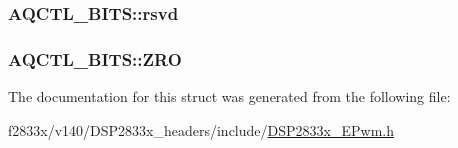 \subsubsection[{rsvd}]{ A\+Q\+C\+T\+L\+\_\+\+B\+I\+T\+S\+::rsvd}\label{struct_a_q_c_t_l___b_i_t_s_a8ac84438d588671b2e7d9f6a48eb4092}
\hypertarget{struct_a_q_c_t_l___b_i_t_s_a364e3885e2683e062df9092186017c2f}{}
\subsubsection[{Z\+R\+O}]{ A\+Q\+C\+T\+L\+\_\+\+B\+I\+T\+S\+::\+Z\+R\+O}\label{struct_a_q_c_t_l___b_i_t_s_a364e3885e2683e062df9092186017c2f}


The documentation for this struct was generated from the following file\+:\begin{DoxyCompactItemize}
\item 
f2833x/v140/\+D\+S\+P2833x\+\_\+headers/include/\hyperlink{_d_s_p2833x___e_pwm_8h}{D\+S\+P2833x\+\_\+\+E\+Pwm.\+h}\end{DoxyCompactItemize}
